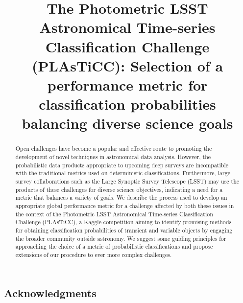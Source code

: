 \documentclass[\docopts]{\docclass}
\begin{document}
\title{The Photometric LSST Astronomical Time-series Classification Challenge (PLAsTiCC): Selection of a performance metric for classification probabilities balancing diverse science goals}

\maketitlepre

\begin{abstract}

  Open challenges have become a popular and effective route to promoting the development of novel techniques in astronomical data analysis.
  However, the probabilistic data products appropriate to upcoming deep surveys are incompatible with the traditional metrics used on deterministic classifications.
  Furthermore, large survey collaborations such as the Large Synoptic Survey Telescope (LSST) may use the products of these challenges for diverse science objectives, indicating a need for a metric that balances a variety of goals.
  We describe the process used to develop an appropriate global performance metric for a challenge affected by both these issues in the context of the Photometric LSST Astronomical Time-series Classification Challenge (PLAsTiCC), a Kaggle competition aiming to identify promising methods for obtaining classification probabilities of transient and variable objects by engaging the broader community outside astronomy.
  We suggest some guiding principles for approaching the choice of a metric of probabilistic classifications and propose extensions of our procedure to ever more complex challenges.

\end{abstract}

\dockeys{}

\maketitlepost















\subsection*{Acknowledgments}
\end{document}
